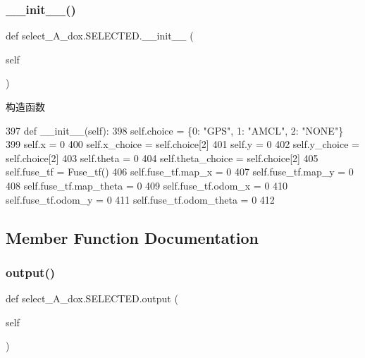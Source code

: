 \subsubsection{\texorpdfstring{\+\_\+\+\_\+init\+\_\+\+\_\+()}{\_\_init\_\_()}}
{\footnotesize\ttfamily def select\+\_\+\+A\+\_\+dox.\+S\+E\+L\+E\+C\+T\+E\+D.\+\_\+\+\_\+init\+\_\+\+\_\+ (\begin{DoxyParamCaption}\item[{}]{self }\end{DoxyParamCaption})}



构造函数 


\begin{DoxyCode}
397     \textcolor{keyword}{def }\_\_init\_\_(self):
398         self.choice = \{0: \textcolor{stringliteral}{"GPS"}, 1: \textcolor{stringliteral}{"AMCL"}, 2: \textcolor{stringliteral}{"NONE"}\}
399         self.x = 0
400         self.x\_choice = self.choice[2]
401         self.y = 0
402         self.y\_choice = self.choice[2]
403         self.theta = 0
404         self.theta\_choice = self.choice[2]
405         self.fuse\_tf = Fuse\_tf()
406         self.fuse\_tf.map\_x = 0
407         self.fuse\_tf.map\_y = 0
408         self.fuse\_tf.map\_theta = 0
409         self.fuse\_tf.odom\_x = 0
410         self.fuse\_tf.odom\_y = 0
411         self.fuse\_tf.odom\_theta = 0
412 
\end{DoxyCode}


\subsection{Member Function Documentation}
\mbox{\label{classselect___a__dox_1_1_s_e_l_e_c_t_e_d_ab38818097e9b5b4e0abd2d2763931ac0}} 
\subsubsection{\texorpdfstring{output()}{output()}}
{\footnotesize\ttfamily def select\+\_\+\+A\+\_\+dox.\+S\+E\+L\+E\+C\+T\+E\+D.\+output (\begin{DoxyParamCaption}\item[{}]{self }\end{DoxyParamCaption})}



